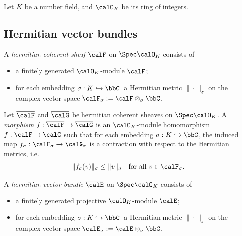 
    Let \(K\) be a number field, and \(\calO_K\) be its ring of integers.


\subsection{Hermitian vector bundles}

    \begin{definition}\label{def:hermitian_coherent_sheaves_on_rings_of_integers}
        A \emph{hermitian coherent sheaf} \(\overline{\calF}\) on \(\Spec \calO_K\) consists of
        \begin{itemize}
            \item a finitely generated \(\calO_K\)-module \(\calF\);
            \item for each embedding \(\sigma: K \hookrightarrow \bbC\), a Hermitian metric \(\|\cdot\|_\sigma\) on the complex vector space \(\calF_\sigma := \calF \otimes_{\sigma} \bbC\).
        \end{itemize}
    \end{definition}

    \begin{definition}\label{def:morphisms_between_hermitian_coherent_sheaves}
        Let \(\overline{\calF}\) and \(\overline{\calG}\) be hermitian coherent sheaves on \(\Spec \calO_K\).
        A \emph{morphism} \(f: \overline{\calF} \to \overline{\calG}\) is an \(\calO_K\)-module homomorphism \(f: \calF \to \calG\) such that for each embedding \(\sigma: K \hookrightarrow \bbC\), the induced map \(f_\sigma: \calF_\sigma \to \calG_\sigma\) is a contraction with respect to the Hermitian metrics, i.e.,
        \[
            \|f_\sigma(v)\|_\sigma \leq \|v\|_\sigma \quad \text{for all } v \in \calF_\sigma.
        \]
    \end{definition}

    \begin{definition}\label{def:hermitian_vector_bundle_on_rings_of_integers}
        A \emph{hermitian vector bundle} \(\overline{\calE}\) on \(\Spec \calO_K\) consists of
        \begin{itemize}
            \item a finitely generated projective \(\calO_K\)-module \(\calE\);
            \item for each embedding \(\sigma: K \hookrightarrow \bbC\), a Hermitian metric \(\|\cdot\|_\sigma\) on the complex vector space \(\calE_\sigma := \calE \otimes_{\sigma} \bbC\).
        \end{itemize}
    \end{definition}


